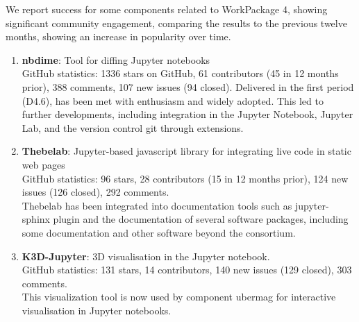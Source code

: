 We report success for some \ODK components related to WorkPackage 4,
showing significant community engagement,
comparing the results to the previous twelve months,
showing an increase in popularity over time.

\begin{enumerate}
\item \textbf{nbdime}: Tool for diffing Jupyter notebooks\\
  GitHub statistics: 1336 stars on GitHub, 61 contributors (45 in 12
  months prior), 388 comments, 107 new issues (94 closed). Delivered
  in the first period (D4.6),  has been met with
  enthusiasm and widely adopted. This led to further developments,
  including integration in the Jupyter Notebook,
  Jupyter Lab, and the version control git through extensions.
\item \textbf{Thebelab}: Jupyter-based javascript library for integrating live code in static web pages\\
  GitHub statistics: 96 stars, 28 contributors (15 in 12 months prior), 124 new issues (126 closed), 292 comments.\\
  Thebelab has been integrated into documentation tools such as jupyter-sphinx plugin
  and the documentation of several software packages,
  including some \SageMath documentation and other software beyond the \ODK consortium.
\item \textbf{K3D-Jupyter}: 3D visualisation in the Jupyter notebook.\\
  GitHub statistics: 131 stars, 14 contributors, 140 new issues (129 closed), 303 comments. \\
  This visualization tool is now used by \ODK component ubermag
  for interactive visualisation in Jupyter notebooks.
\end{enumerate}


